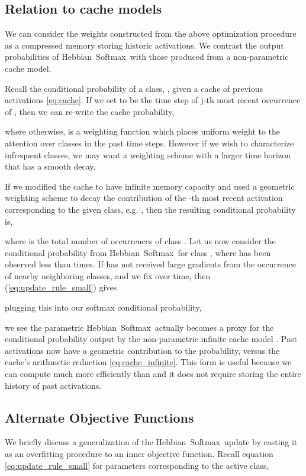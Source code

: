 \documentclass{article} \usepackage{hyperref}
\newcommand{\model}{\hbox{Hebbian Softmax }}
\begin{document}
\subsection{Relation to cache models}
\label{sec:compressed_memory}
We can consider the weights constructed from the above optimization procedure as a compressed memory storing historic activations. We contrast the output probabilities of \model with those produced from a non-parametric cache model.

Recall the conditional probability of a class, , given a cache of previous activations \eqref{eq:cache}. If we set  to be the time step of j-th most recent occurrence of , then we can re-write the cache probability,

where  otherwise, is a weighting function which places uniform weight to the attention over classes in the past  time steps. However if we wish to characterize infrequent classes, we may want a weighting scheme with a larger time horizon that has a smooth decay.

If we modified the cache to have infinite memory capacity and used a geometric weighting scheme to decay the contribution of the -th most recent activation corresponding to the given class, e.g. , then the resulting conditional probability is,

where  is the total number of occurrences of class . Let us now consider the conditional probability from \model for class , where  has been observed less than  times. If  has not received large gradients from the occurrence of nearby neighboring classes, and we fix  over time, then (\ref{eq:update_rule_small}) gives

plugging this into our softmax conditional probability,

we see the parametric \model actually becomes a proxy for the conditional probability output by the non-parametric infinite cache model . Past activations now have a geometric contribution to the probability, versus the cache's arithmetic reduction \eqref{eq:cache_infinite}. This form is useful because we can compute  much more efficiently than  and it does not require storing the entire history of past activations.

\subsection{Alternate Objective Functions}
\label{sec:alternates}
We briefly discuss a generalization of the \model update by casting it as an overfitting procedure to an inner objective function. Recall equation \eqref{eq:update_rule_small} for parameters corresponding to the active class, 
\end{document}
